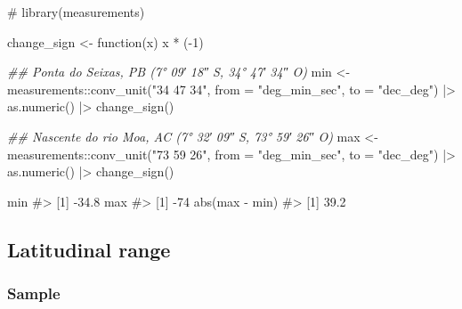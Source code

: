 \documentclass[
  12pt,
  a4paper,
  oneside]{tesesusp}
\newenvironment{Shaded}{\begin{snugshade}}{\end{snugshade}}
\newcommand{\AttributeTok}[1]{\textcolor[rgb]{0.40,0.45,0.13}{#1}}
\newcommand{\CommentTok}[1]{\textcolor[rgb]{0.37,0.37,0.37}{#1}}
\newcommand{\ControlFlowTok}[1]{\textcolor[rgb]{0.00,0.23,0.31}{#1}}
\newcommand{\DecValTok}[1]{\textcolor[rgb]{0.68,0.00,0.00}{#1}}
\newcommand{\DocumentationTok}[1]{\textcolor[rgb]{0.37,0.37,0.37}{\textit{#1}}}
\newcommand{\FunctionTok}[1]{\textcolor[rgb]{0.28,0.35,0.67}{#1}}
\newcommand{\NormalTok}[1]{\textcolor[rgb]{0.00,0.23,0.31}{#1}}
\newcommand{\OtherTok}[1]{\textcolor[rgb]{0.00,0.23,0.31}{#1}}
\newcommand{\SpecialCharTok}[1]{\textcolor[rgb]{0.37,0.37,0.37}{#1}}
\newcommand{\StringTok}[1]{\textcolor[rgb]{0.13,0.47,0.30}{#1}}
\begin{document}
\begin{Shaded}
\begin{Highlighting}[numbers=left,,]
\CommentTok{\# library(measurements)}

\NormalTok{change\_sign }\OtherTok{\textless{}{-}} \ControlFlowTok{function}\NormalTok{(x) x }\SpecialCharTok{*}\NormalTok{ (}\SpecialCharTok{{-}}\DecValTok{1}\NormalTok{)}

\DocumentationTok{\#\# Ponta do Seixas, PB (7° 09′ 18″ S, 34° 47′ 34″ O)}
\NormalTok{min }\OtherTok{\textless{}{-}} 
\NormalTok{  measurements}\SpecialCharTok{::}\FunctionTok{conv\_unit}\NormalTok{(}\StringTok{"34 47 34"}\NormalTok{, }\AttributeTok{from =} \StringTok{"deg\_min\_sec"}\NormalTok{, }\AttributeTok{to =} \StringTok{"dec\_deg"}\NormalTok{) }\SpecialCharTok{|\textgreater{}}
  \FunctionTok{as.numeric}\NormalTok{() }\SpecialCharTok{|\textgreater{}}
  \FunctionTok{change\_sign}\NormalTok{()}

\DocumentationTok{\#\# Nascente do rio Moa, AC (7° 32′ 09″ S, 73° 59′ 26″ O)}
\NormalTok{max }\OtherTok{\textless{}{-}} 
\NormalTok{  measurements}\SpecialCharTok{::}\FunctionTok{conv\_unit}\NormalTok{(}\StringTok{"73 59 26"}\NormalTok{, }\AttributeTok{from =} \StringTok{"deg\_min\_sec"}\NormalTok{, }\AttributeTok{to =} \StringTok{"dec\_deg"}\NormalTok{) }\SpecialCharTok{|\textgreater{}}
  \FunctionTok{as.numeric}\NormalTok{() }\SpecialCharTok{|\textgreater{}}
  \FunctionTok{change\_sign}\NormalTok{()}

\NormalTok{min}
\CommentTok{\#\textgreater{} [1] {-}34.8}
\NormalTok{max}
\CommentTok{\#\textgreater{} [1] {-}74}
\FunctionTok{abs}\NormalTok{(max }\SpecialCharTok{{-}}\NormalTok{ min)}
\CommentTok{\#\textgreater{} [1] 39.2}
\end{Highlighting}
\end{Shaded}

\hypertarget{latitudinal-range}{%
\subsection{Latitudinal range}\label{latitudinal-range}}

\hypertarget{sample-2}{%
\subsubsection{Sample}\label{sample-2}}
\end{document}
